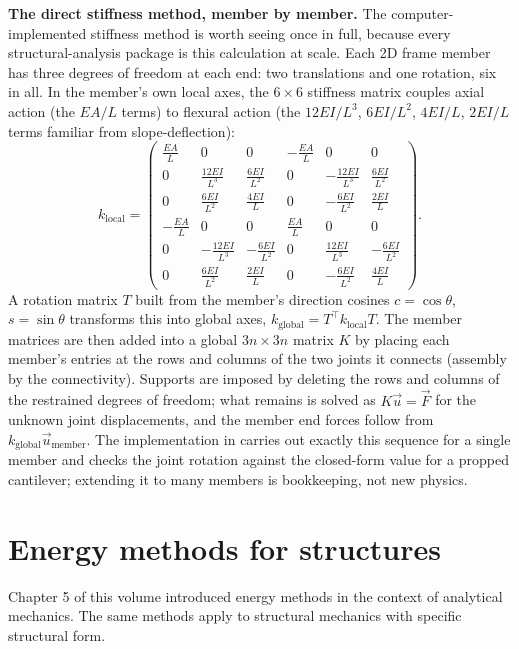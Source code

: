 \begin{mastery}
\textbf{The direct stiffness method, member by member.} The
computer-implemented stiffness method is worth seeing once in full,
because every structural-analysis package is this calculation at scale.
Each 2D frame member has three degrees of freedom at each end: two
translations and one rotation, six in all. In the member's own local
axes, the $6\times 6$ stiffness matrix couples axial action (the
$EA/L$ terms) to flexural action (the $12EI/L^3$, $6EI/L^2$, $4EI/L$,
$2EI/L$ terms familiar from slope-deflection):
\[
k_{\text{local}} =
\begin{pmatrix}
\frac{EA}{L} & 0 & 0 & -\frac{EA}{L} & 0 & 0 \\[2pt]
0 & \frac{12EI}{L^3} & \frac{6EI}{L^2} & 0 & -\frac{12EI}{L^3} & \frac{6EI}{L^2} \\[2pt]
0 & \frac{6EI}{L^2} & \frac{4EI}{L} & 0 & -\frac{6EI}{L^2} & \frac{2EI}{L} \\[2pt]
-\frac{EA}{L} & 0 & 0 & \frac{EA}{L} & 0 & 0 \\[2pt]
0 & -\frac{12EI}{L^3} & -\frac{6EI}{L^2} & 0 & \frac{12EI}{L^3} & -\frac{6EI}{L^2} \\[2pt]
0 & \frac{6EI}{L^2} & \frac{2EI}{L} & 0 & -\frac{6EI}{L^2} & \frac{4EI}{L}
\end{pmatrix}.
\]
A rotation matrix $T$ built from the member's direction cosines
$c=\cos\theta$, $s=\sin\theta$ transforms this into global axes,
$k_{\text{global}} = T^{\!\top} k_{\text{local}} T$. The member
matrices are then added into a global $3n\times 3n$ matrix $K$ by
placing each member's entries at the rows and columns of the two
joints it connects (assembly by the connectivity). Supports are
imposed by deleting the rows and columns of the restrained degrees of
freedom; what remains is solved as $K\vec{u}=\vec{F}$ for the unknown
joint displacements, and the member end forces follow from
$k_{\text{global}}\vec{u}_{\text{member}}$. The implementation in
 carries out exactly this sequence for a
single member and checks the joint rotation against the closed-form
value for a propped cantilever; extending it to many members is
bookkeeping, not new physics.
\end{mastery}

\section{Energy methods for structures}

Chapter 5 of this volume introduced energy methods in the context of
analytical mechanics. The same methods apply to structural mechanics
with specific structural form.

